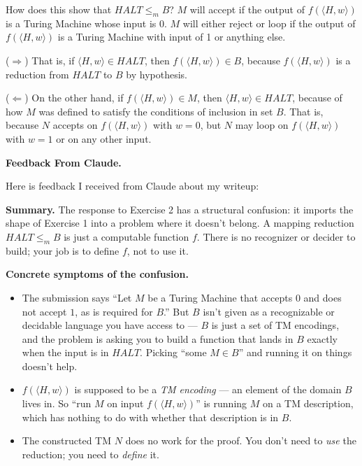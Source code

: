 \documentclass[11pt]{article}
\begin{document}
\begin{enumerate}[label=\textbf{Exercise \arabic{*}}]
        How does this show that $HALT \le_m B$? $M$ will accept if the output of $f(\langle H, w \rangle)$ is a Turing Machine whose input is 0. $M$ will either reject or loop if the output of $f(\langle H, w \rangle)$ is a Turing Machine with input of 1 or anything else.

        ($\Rightarrow$) That is, if $\langle H, w \rangle \in HALT$, then $f(\langle H, w \rangle) \in B$, because $f(\langle H, w \rangle)$ is a reduction from $HALT$ to $B$ by hypothesis.

        ($\Leftarrow$) On the other hand, if $f(\langle H, w \rangle) \in M$, then $\langle H, w \rangle \in HALT$, because of how $M$ was defined to satisfy the conditions of inclusion in set $B$. That is, because $N$ accepts on $f(\langle H, w \rangle)$ with $w = 0$, but $N$ may loop on $f(\langle H, w \rangle)$ with $w = 1$ or on any other input.

        \medskip

        \textbf{Feedback From Claude.}

        Here is feedback I received from Claude about my writeup:

        \medskip

        \textbf{Summary.} The response to Exercise 2 has a structural confusion: it imports the shape of Exercise 1 into a problem where it doesn't belong. A mapping reduction $HALT \le_m B$ is just a computable function $f$. There is no recognizer or decider to build; your job is to define $f$, not to use it.

        \medskip

        \textbf{Concrete symptoms of the confusion.}

        \begin{itemize}
          \item The submission says ``Let $M$ be a Turing Machine that accepts $0$ and does not accept $1$, as is required for $B$.'' But $B$ isn't given as a recognizable or decidable language you have access to --- $B$ is just a set of TM encodings, and the problem is asking you to build a function that lands in $B$ exactly when the input is in $HALT$. Picking ``some $M \in B$'' and running it on things doesn't help.
          \item $f(\langle H, w \rangle)$ is supposed to be a \emph{TM encoding} --- an element of the domain $B$ lives in. So ``run $M$ on input $f(\langle H, w \rangle)$'' is running $M$ on a TM description, which has nothing to do with whether that description is in $B$.
          \item The constructed TM $N$ does no work for the proof. You don't need to \emph{use} the reduction; you need to \emph{define} it.
        \end{itemize}


\end{enumerate}
\end{document}
